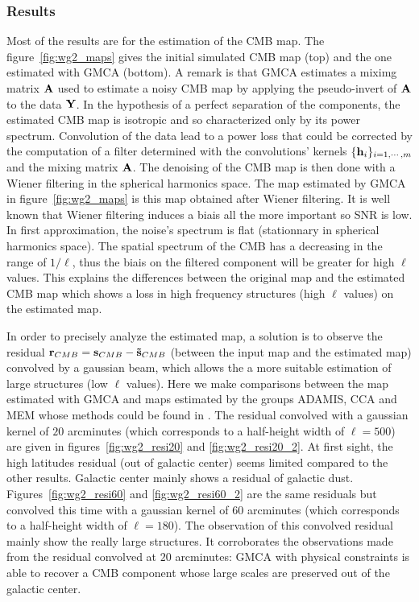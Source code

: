\subsubsection{Results}

Most of the results are for the estimation of the CMB map. The figure~\ref{fig:wg2_maps} gives the initial simulated CMB map (top) and the one estimated with GMCA (bottom). 
A remark is that GMCA estimates a miximg matrix $\bf A$ used to estimate a noisy CMB map by applying the pseudo-invert of $\bf A$ to the data $\bf Y$. In the hypothesis of 
a perfect separation of the components, the estimated CMB map is isotropic and so characterized only by its power spectrum. Convolution of the data lead to a power loss that 
could be corrected by the computation of a filter determined with the convolutions' kernels $\{{\bf h}_i\}_{i=1,\cdots,m}$ and the mixing matrix $\bf A$. The denoising of 
the CMB map is then done with a Wiener filtering in the spherical harmonics space. The map estimated by GMCA in figure~\ref{fig:wg2_maps} is this map obtained after Wiener filtering. 
It is well known that Wiener filtering induces a biais all the more important so SNR is low. In first approximation, the noise's spectrum is flat (stationnary in spherical harmonics space). 
The spatial spectrum of the CMB has a decreasing in the range of $1/\ell$, thus the biais on the filtered component will be greater for high $\ell$ values. This explains the differences 
between the original map and the estimated CMB map which shows a loss in high frequency structures (high $\ell$ values) on the estimated map.

In order to precisely analyze the estimated map, a solution is to observe the residual ${\bf r}_{CMB} = {\bf s}_{CMB} - {\bf \tilde{s}}_{CMB}$ (between the input map and the estimated map) 
convolved by a gaussian beam, which allows the a more suitable estimation of large structures (low $\ell$ values). Here we make comparisons between the map estimated with GMCA and maps 
estimated by the groups ADAMIS, CCA and MEM whose methods could be found in \citep{leach08}. The residual convolved with a gaussian kernel of $20$ arcminutes (which corresponds to a 
half-height width of $\ell = 500$) are given in figures~\ref{fig:wg2_resi20} and \ref{fig:wg2_resi20_2}. At first sight, the high latitudes residual (out of galactic center) seems limited 
compared to the other results. Galactic center mainly shows a residual of galactic dust. Figures~\ref{fig:wg2_resi60} and \ref{fig:wg2_resi60_2} are the same residuals but convolved this time 
with a gaussian kernel of $60$ arcminutes (which corresponds to a half-height width of $\ell = 180$). The observation of this convolved residual mainly show the really large structures. 
It corroborates the   observations made from the residual convolved at $20$ arcminutes: GMCA with physical constraints is able to recover a CMB component whose large scales are preserved 
out of the galactic center.

